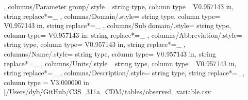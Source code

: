 \begin{landscape}
{        },
    columns/Parameter group/.style={
            string type, 
            column type= V{0.957143 in}, 
            string replace*={_}{}
        },
    columns/Domain/.style={
            string type, 
            column type= V{0.957143 in}, 
            string replace*={_}{}
        },
    columns/Sub domain/.style={
            string type, 
            column type= V{0.957143 in}, 
            string replace*={_}{}
        },
    columns/Abbreviation/.style={
            string type, 
            column type= V{0.957143 in}, 
            string replace*={_}{}
        },
    columns/Name/.style={
            string type, 
            column type= V{0.957143 in}, 
            string replace*={_}{}
        },
    columns/Units/.style={
            string type, 
            column type= V{0.957143 in}, 
            string replace*={_}{}
        },
    columns/Description/.style={
            string type, 
            string replace*={_}{},
            column type = V{3.000000 in}
        }
    ]{/Users/dyb/GitHub/C3S_311a_CDM/tables/observed_variable.csv}
\end{landscape}
